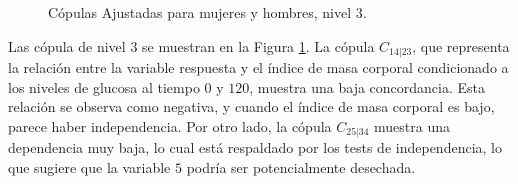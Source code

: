 \begin{figure}[H]
 \centering
    \caption{Cópulas Ajustadas para mujeres y hombres, nivel $3$.}
    \label{fig:Modelo4TotalNivel3}
\end{figure}


Las cópula de nivel $3$ se muestran en la Figura \ref{fig:Modelo4TotalNivel3}. La cópula $C_{14|23}$, que representa la relación entre la variable respuesta y el índice de masa corporal condicionado a los niveles de glucosa al tiempo $0$ y $120$, muestra una baja concordancia. Esta relación se observa como negativa, y cuando el índice de masa corporal es bajo, parece haber independencia. Por otro lado, la cópula $C_{25|34}$ muestra una dependencia muy baja, lo cual está respaldado por los tests de independencia, lo que sugiere que la variable $5$ podría ser potencialmente desechada.



